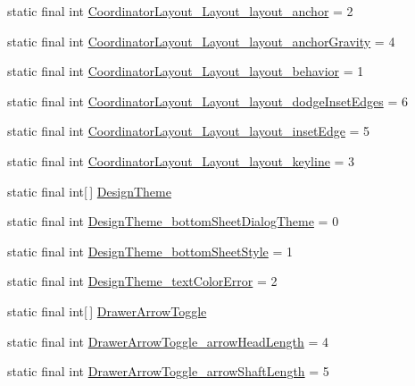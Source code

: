 \begin{CompactItemize}
static final int \hyperlink{classandroid_1_1support_1_1v4_1_1_r_1_1styleable_b35a32b00f117fac198051858264bb36}{CoordinatorLayout\_\-Layout\_\-layout\_\-anchor} = 2
\item 
static final int \hyperlink{classandroid_1_1support_1_1v4_1_1_r_1_1styleable_f6e5589929bcbc99b0bcbeb23e048b95}{CoordinatorLayout\_\-Layout\_\-layout\_\-anchorGravity} = 4
\item 
static final int \hyperlink{classandroid_1_1support_1_1v4_1_1_r_1_1styleable_982d12aa414414e1e0475e69c9587a1c}{CoordinatorLayout\_\-Layout\_\-layout\_\-behavior} = 1
\item 
static final int \hyperlink{classandroid_1_1support_1_1v4_1_1_r_1_1styleable_a57573ce33cb7197819b20094f59046d}{CoordinatorLayout\_\-Layout\_\-layout\_\-dodgeInsetEdges} = 6
\item 
static final int \hyperlink{classandroid_1_1support_1_1v4_1_1_r_1_1styleable_b928d3f0b1a126bfb85b144df1690720}{CoordinatorLayout\_\-Layout\_\-layout\_\-insetEdge} = 5
\item 
static final int \hyperlink{classandroid_1_1support_1_1v4_1_1_r_1_1styleable_b7235d7fb22787830b44526e15a68fe4}{CoordinatorLayout\_\-Layout\_\-layout\_\-keyline} = 3
\item 
static final int\mbox{[}$\,$\mbox{]} \hyperlink{classandroid_1_1support_1_1v4_1_1_r_1_1styleable_1fc2363c6b6b67c6e45666c3b79caadd}{DesignTheme}
\item 
static final int \hyperlink{classandroid_1_1support_1_1v4_1_1_r_1_1styleable_c39dd68ad5c202e825274182cb02ccab}{DesignTheme\_\-bottomSheetDialogTheme} = 0
\item 
static final int \hyperlink{classandroid_1_1support_1_1v4_1_1_r_1_1styleable_b70c83958d9304b700d491f7de3a0af7}{DesignTheme\_\-bottomSheetStyle} = 1
\item 
static final int \hyperlink{classandroid_1_1support_1_1v4_1_1_r_1_1styleable_0574e76a7adf8330c0f630fbe9312cc2}{DesignTheme\_\-textColorError} = 2
\item 
static final int\mbox{[}$\,$\mbox{]} \hyperlink{classandroid_1_1support_1_1v4_1_1_r_1_1styleable_df2952a999161d3c408fb6267800afe6}{DrawerArrowToggle}
\item 
static final int \hyperlink{classandroid_1_1support_1_1v4_1_1_r_1_1styleable_1ae0d3d719748ee9ce810c7e3db7ab26}{DrawerArrowToggle\_\-arrowHeadLength} = 4
\item 
static final int \hyperlink{classandroid_1_1support_1_1v4_1_1_r_1_1styleable_019721c1dd6ebdd0cf7066eefbb929f5}{DrawerArrowToggle\_\-arrowShaftLength} = 5

\end{CompactItemize}
